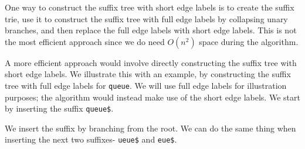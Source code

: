 \documentclass[a4paper, openany]{memoir}
\begin{document}
    One way to construct the suffix tree with short edge labels is to create the suffix trie, use it to construct the suffix tree with full edge labels by collapsing unary branches, and then replace the full edge labels with short edge labels. This is not the most efficient approach since we do need $O(n^2)$ space during the algorithm.

    A more efficient approach would involve directly constructing the suffix tree with short edge labels. We illustrate this with an example, by constructing the suffix tree with full edge labels for \texttt{queue}. We will use full edge labels for illustration purposes; the algorithm would instead make use of the short edge labels. We start by inserting the suffix \texttt{queue\$}.
    \begin{figure}[H]
        \centering
    \end{figure}
    \noindent We insert the suffix by branching from the root. We can do the same thing when inserting the next two suffixes- \texttt{ueue\$} and \texttt{eue\$}.
    \begin{figure}[H]
        \centering
    \end{figure}
\end{document}
